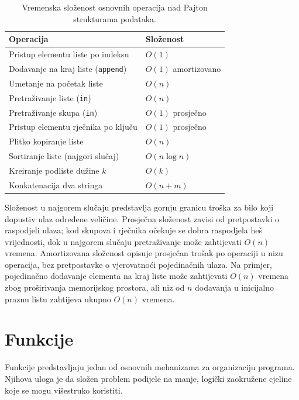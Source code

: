 \begin{table}[htbp]
\centering
\small
\caption{Vremenska složenost osnovnih operacija nad Pajton strukturama podataka.}
\label{tab:python-complexity}
\begin{tabular}{|p{}|p{}|}
\hline
\textbf{Operacija} & \textbf{Složenost} \\ \hline
Pristup elementu liste po indeksu & $O(1)$ \\ \hline
Dodavanje na kraj liste (\texttt{append}) & $O(1)$ amortizovano \\ \hline
Umetanje na početak liste & $O(n)$ \\ \hline
Pretraživanje liste (\texttt{in}) & $O(n)$ \\ \hline
Pretraživanje skupa (\texttt{in}) & $O(1)$ prosječno \\ \hline
Pristup elementu rječnika po ključu & $O(1)$ prosječno \\ \hline
Plitko kopiranje liste & $O(n)$ \\ \hline
Sortiranje liste (najgori slučaj) & $O(n\log n)$ \\ \hline
Kreiranje podliste dužine $k$ & $O(k)$ \\ \hline
Konkatenacija dva stringa & $O(n+m)$ \\ \hline
\end{tabular}
\end{table}

Složenost u najgorem slučaju predstavlja gornju granicu troška za bilo koji dopustiv ulaz određene veličine. Prosječna složenost zavisi od pretpostavki o raspodjeli ulaza; kod skupova i rječnika očekuje se dobra raspodjela heš vrijednosti, dok u najgorem slučaju pretraživanje može zahtijevati $O(n)$ vremena. Amortizovana složenost opisuje prosječan trošak po operaciji u nizu operacija, bez pretpostavke o vjerovatnoći pojedinačnih ulaza. Na primjer, pojedinačno dodavanje elementa na kraj liste može zahtijevati $O(n)$ vremena zbog proširivanja memorijskog prostora, ali niz od $n$ dodavanja u inicijalno praznu listu zahtijeva ukupno $O(n)$ vremena.

\section{Funkcije}

Funkcije predstavljaju jedan od osnovnih mehanizama za organizaciju programa. Njihova uloga je da složen problem podijele na manje, logički zaokružene cjeline koje se mogu višestruko koristiti.

